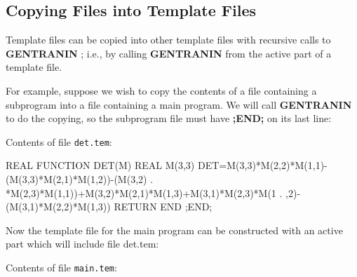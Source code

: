 \subsection{Copying Files into Template Files}
\label{copy:template}

 
Template files can be copied into other template files with recursive
calls to {\bf GENTRANIN} ; i.e., by calling {\bf GENTRANIN} from the
active part of a template file.

For example, suppose we wish to copy the contents of a file containing
a subprogram into a file containing a main program.  We will call 
{\bf GENTRANIN} to do the copying, so the subprogram file must
have {\bf ;END;} on its last line:

Contents of file {\tt det.tem}:
\begin{framedverbatim}
      REAL FUNCTION DET(M)                              
      REAL M(3,3)                                       
      DET=M(3,3)*M(2,2)*M(1,1)-(M(3,3)*M(2,1)*M(1,2))-(M(3,2)
     . *M(2,3)*M(1,1))+M(3,2)*M(2,1)*M(1,3)+M(3,1)*M(2,3)*M(1
     . ,2)-(M(3,1)*M(2,2)*M(1,3))
      RETURN                                              
      END                                                 
;END;                                                     
\end{framedverbatim} 

Now the template file for the main program can be constructed
with an active part which will include file det.tem:

Contents of file {\tt main.tem}:

